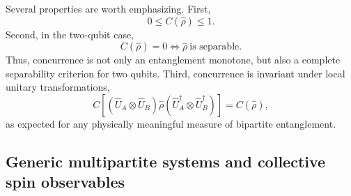 Several properties are worth emphasizing. First,
\begin{equation}
	0\leq C(\hat \rho)\leq 1.
	\label{eq:intro_qm_concurrence_bounds_mixed}
\end{equation}
Second, in the two-qubit case,
\begin{equation}
	C(\hat \rho)=0
	\iff
	\hat \rho\ \text{is separable}.
	\label{eq:intro_qm_concurrence_zero_iff_separable}
\end{equation}
Thus, concurrence is not only an entanglement monotone, but also a complete separability criterion for two qubits. Third, concurrence is invariant under local unitary transformations,
\begin{equation}
	C\!\left[
	(\hat U_A\otimes \hat U_B)\hat \rho
	(\hat U_A^\dagger\otimes \hat U_B^\dagger)
	\right]
	=
	C(\hat \rho),
	\label{eq:intro_qm_concurrence_local_unitary_invariance}
\end{equation}
as expected for any physically meaningful measure of bipartite entanglement.

\subsection{Generic multipartite systems and collective spin observables}
\label{subsec:multipartite_systems_and_collective_spin_operators}

